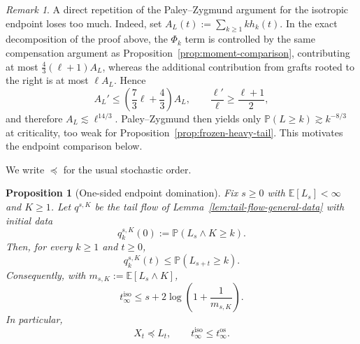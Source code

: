 \documentclass[11pt,a4paper]{amsart}
\newtheorem{proposition}[theorem]{Proposition}
\theoremstyle{remark}
\newtheorem{remark}[theorem]{Remark}
\begin{document}
\begin{remark}
A direct repetition of the Paley--Zygmund argument for the isotropic
endpoint loses too much. Indeed, set
$A_L(t):=\sum_{k\geq1}k h_k(t)$. In the exact decomposition of the proof
above, the $\Phi_k$ term is controlled by the same compensation argument
as Proposition~\ref{prop:moment-comparison}, contributing at most
$\frac43(\ell+1)A_L$, whereas the additional contribution from grafts
rooted to the right is at most $\ell A_L$. Hence
\[
A_L'\leq\left(\frac73\ell+\frac43\right)A_L,
\qquad
\frac{\ell'}{\ell}\geq\frac{\ell+1}{2},
\]
and therefore $A_L\lesssim\ell^{14/3}$. Paley--Zygmund then yields only
$\mathbb P(L\geq k)\gtrsim k^{-8/3}$ at criticality, too weak for
Proposition~\ref{prop:frozen-heavy-tail}. This motivates the endpoint
comparison below.
\end{remark}
We write $\preceq$ for the usual stochastic order.
\begin{proposition}[One-sided endpoint domination]
\label{prop:isotropic-endpoint-domination}
Fix $s\geq0$ with $\mathbb E[L_s]<\infty$ and $K\geq1$. Let
$q^{s,K}$ be the tail flow of Lemma~\ref{lem:tail-flow-general-data}
with initial data
\[
q_k^{s,K}(0)
:=
\mathbb P(L_s\wedge K\geq k).
\]
Then, for every $k\geq1$ and $t\geq0$,
\begin{equation}
\label{eq:isotropic-endpoint-domination}
q_k^{s,K}(t)
\leq
\mathbb P(L_{s+t}\geq k).
\end{equation}
Consequently, with $m_{s,K}:=\mathbb E[L_s\wedge K]$,
\begin{equation}
\label{eq:isotropic-explosion-upper}
t_{\infty}^{\mathrm{iso}}
\leq
s+2\log\left(1+\frac1{m_{s,K}}\right).
\end{equation}
In particular,
\begin{equation}
\label{eq:isotropic-one-sided-threshold-comparison}
X_t\preceq L_t,
\qquad
t_{\infty}^{\mathrm{iso}}
\leq t_{\infty}^{\mathrm{os}}.
\end{equation}
\end{proposition}
\end{document}
